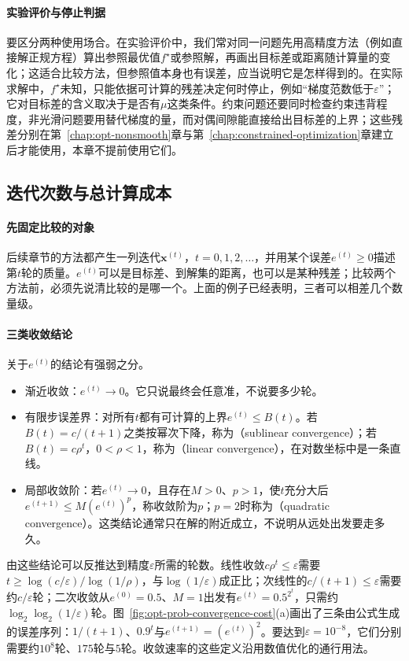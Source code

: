 \paragraph{实验评价与停止判据}
要区分两种使用场合。在实验评价中，我们常对同一问题先用高精度方法（例如直接解正规方程）算出参照最优值$f^\star$或参照解，再画出目标差或距离随计算量的变化；这适合比较方法，但参照值本身也有误差，应当说明它是怎样得到的。在实际求解中，$f^\star$未知，只能依据可计算的残差决定何时停止，例如“梯度范数低于$\varepsilon$”；它对目标差的含义取决于是否有$\mu$这类条件。约束问题还要同时检查约束违背程度，非光滑问题要用替代梯度的量，而对偶间隙能直接给出目标差的上界；这些残差分别在第~\ref{chap:opt-nonsmooth}章与第~\ref{chap:constrained-optimization}章建立后才能使用，本章不提前使用它们。

\subsection{迭代次数与总计算成本}
\label{sec:opt-prob-cost}

\paragraph{先固定比较的对象}
后续章节的方法都产生一列迭代$\bm x^{(t)}$，$t=0,1,2,\dots$，并用某个误差$e^{(t)}\geq0$描述第$t$轮的质量。$e^{(t)}$可以是目标差、到解集的距离，也可以是某种残差；比较两个方法前，必须先说清比较的是哪一个。上面的例子已经表明，三者可以相差几个数量级。

\paragraph{三类收敛结论}
关于$e^{(t)}$的结论有强弱之分。
\begin{itemize}
  \item 渐近收敛：$e^{(t)}\to0$。它只说最终会任意准，不说要多少轮。
  \item 有限步误差界：对所有$t$都有可计算的上界$e^{(t)}\leq B(t)$。若$B(t)=c/(t+1)$之类按幂次下降，称为（sublinear convergence）；若$B(t)=c\rho^t$，$0<\rho<1$，称为（linear convergence），在对数坐标中是一条直线。
  \item 局部收敛阶：若$e^{(t)}\to0$，且存在$M>0$、$p>1$，使$t$充分大后$e^{(t+1)}\leq M(e^{(t)})^p$，称收敛阶为$p$；$p=2$时称为（quadratic convergence）。这类结论通常只在解的附近成立，不说明从远处出发要走多久。
\end{itemize}

由这些结论可以反推达到精度$\varepsilon$所需的轮数。线性收敛$c\rho^t\leq\varepsilon$需要$t\geq\log(c/\varepsilon)/\log(1/\rho)$，与$\log(1/\varepsilon)$成正比；次线性的$c/(t+1)\leq\varepsilon$需要约$c/\varepsilon$轮；二次收敛从$e^{(0)}=0.5$、$M=1$出发有$e^{(t)}=0.5^{2^t}$，只需约$\log_2\log_2(1/\varepsilon)$轮。图~\ref{fig:opt-prob-convergence-cost}(a)画出了三条由公式生成的误差序列：$1/(t+1)$、$0.9^t$与$e^{(t+1)}=(e^{(t)})^2$。要达到$\varepsilon=10^{-8}$，它们分别需要约$10^8$轮、$175$轮与$5$轮。收敛速率的这些定义沿用数值优化的通行用法。

